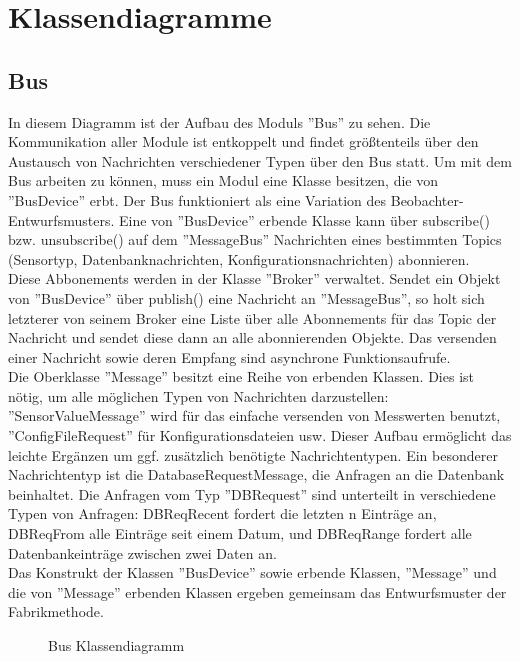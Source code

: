 \documentclass[entwurf.tex]{subfiles}
\begin{document}
\chapter{Klassendiagramme}
	\section{Bus}
		
  		In diesem Diagramm ist der Aufbau des Moduls ''Bus'' zu sehen. Die Kommunikation aller Module ist entkoppelt und findet größtenteils über den Austausch von Nachrichten verschiedener Typen über den Bus statt. Um mit dem Bus arbeiten zu können, muss ein Modul eine Klasse besitzen, die von ''BusDevice'' erbt. Der Bus funktioniert als eine Variation des Beobachter-Entwurfsmusters. Eine von ''BusDevice'' erbende Klasse kann über subscribe() bzw. unsubscribe() auf dem ''MessageBus'' Nachrichten eines bestimmten Topics (Sensortyp, Datenbanknachrichten, Konfigurationsnachrichten) abonnieren. \\
  		Diese Abbonements werden in der Klasse ''Broker'' verwaltet. Sendet ein Objekt von ''BusDevice'' über publish() eine Nachricht an ''MessageBus'', so holt sich letzterer von seinem Broker eine Liste über alle Abonnements für das Topic der Nachricht und sendet diese dann an alle abonnierenden Objekte. Das versenden einer Nachricht sowie deren Empfang sind asynchrone Funktionsaufrufe. \\
  		Die Oberklasse ''Message'' besitzt eine Reihe von erbenden Klassen. Dies ist nötig, um alle möglichen Typen von Nachrichten darzustellen: ''SensorValueMessage'' wird für das einfache versenden von Messwerten benutzt, ''ConfigFileRequest'' für Konfigurationsdateien usw. Dieser Aufbau ermöglicht das leichte Ergänzen um ggf. zusätzlich benötigte Nachrichtentypen. Ein besonderer Nachrichtentyp ist die DatabaseRequestMessage, die Anfragen an die Datenbank beinhaltet. Die Anfragen vom Typ ''DBRequest'' sind unterteilt in verschiedene Typen von Anfragen: DBReqRecent fordert die letzten n Einträge an, DBReqFrom alle Einträge seit einem Datum, und DBReqRange fordert alle Datenbankeinträge zwischen zwei Daten an. \\
  		Das Konstrukt  der Klassen ''BusDevice'' sowie erbende Klassen, ''Message'' und die von ''Message'' erbenden Klassen ergeben gemeinsam das Entwurfsmuster der Fabrikmethode. 
  		
  		\begin{figure}[H]
  			\begin{center}
  				\caption{Bus Klassendiagramm}
  			\end{center}
  		\end{figure}
  	
\end{document}
